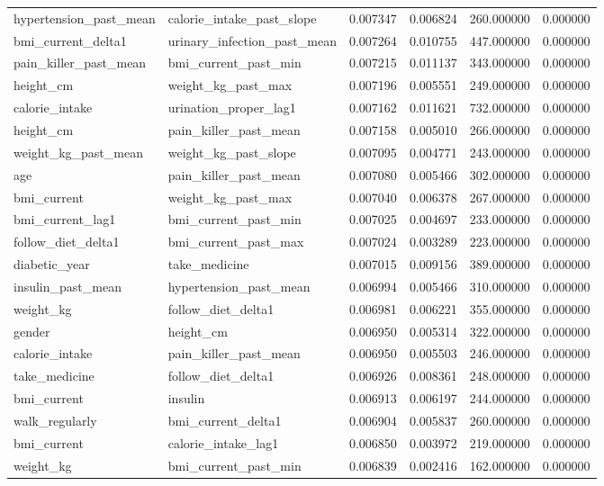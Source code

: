 \begin{longtable}{llrrrr}
hypertension\_past\_mean & calorie\_intake\_past\_slope & 0.007347 & 0.006824 & 260.000000 & 0.000000 \\
bmi\_current\_delta1 & urinary\_infection\_past\_mean & 0.007264 & 0.010755 & 447.000000 & 0.000000 \\
pain\_killer\_past\_mean & bmi\_current\_past\_min & 0.007215 & 0.011137 & 343.000000 & 0.000000 \\
height\_cm & weight\_kg\_past\_max & 0.007196 & 0.005551 & 249.000000 & 0.000000 \\
calorie\_intake & urination\_proper\_lag1 & 0.007162 & 0.011621 & 732.000000 & 0.000000 \\
height\_cm & pain\_killer\_past\_mean & 0.007158 & 0.005010 & 266.000000 & 0.000000 \\
weight\_kg\_past\_mean & weight\_kg\_past\_slope & 0.007095 & 0.004771 & 243.000000 & 0.000000 \\
age & pain\_killer\_past\_mean & 0.007080 & 0.005466 & 302.000000 & 0.000000 \\
bmi\_current & weight\_kg\_past\_max & 0.007040 & 0.006378 & 267.000000 & 0.000000 \\
bmi\_current\_lag1 & bmi\_current\_past\_min & 0.007025 & 0.004697 & 233.000000 & 0.000000 \\
follow\_diet\_delta1 & bmi\_current\_past\_max & 0.007024 & 0.003289 & 223.000000 & 0.000000 \\
diabetic\_year & take\_medicine & 0.007015 & 0.009156 & 389.000000 & 0.000000 \\
insulin\_past\_mean & hypertension\_past\_mean & 0.006994 & 0.005466 & 310.000000 & 0.000000 \\
weight\_kg & follow\_diet\_delta1 & 0.006981 & 0.006221 & 355.000000 & 0.000000 \\
gender & height\_cm & 0.006950 & 0.005314 & 322.000000 & 0.000000 \\
calorie\_intake & pain\_killer\_past\_mean & 0.006950 & 0.005503 & 246.000000 & 0.000000 \\
take\_medicine & follow\_diet\_delta1 & 0.006926 & 0.008361 & 248.000000 & 0.000000 \\
bmi\_current & insulin & 0.006913 & 0.006197 & 244.000000 & 0.000000 \\
walk\_regularly & bmi\_current\_delta1 & 0.006904 & 0.005837 & 260.000000 & 0.000000 \\
bmi\_current & calorie\_intake\_lag1 & 0.006850 & 0.003972 & 219.000000 & 0.000000 \\
weight\_kg & bmi\_current\_past\_min & 0.006839 & 0.002416 & 162.000000 & 0.000000 \\

\end{longtable}
